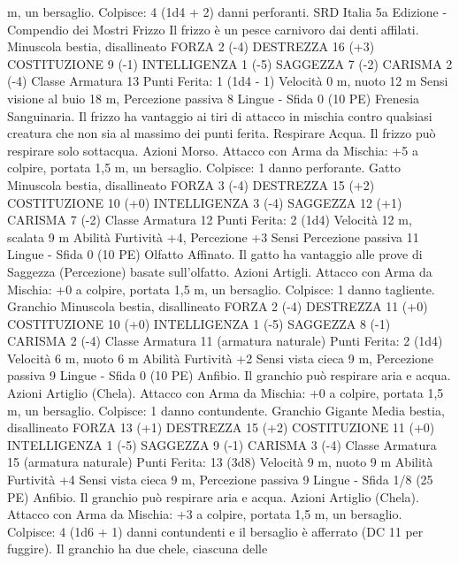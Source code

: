 \begin{multicols}{2}
m, un bersaglio.
Colpisce: 4 (1d4 + 2) danni perforanti.
SRD Italia 5a Edizione - Compendio dei Mostri
Frizzo
Il frizzo è un pesce carnivoro dai denti affilati.
Minuscola bestia, disallineato
FORZA 2 (-4)
DESTREZZA 16 (+3)
COSTITUZIONE 9 (-1)
INTELLIGENZA 1 (-5)
SAGGEZZA 7 (-2)
CARISMA 2 (-4)
Classe Armatura 13
\hspace*{0pt}\hfill{Punti Ferita}: 1 (1d4 - 1)
Velocità 0 m, nuoto 12 m
Sensi visione al buio 18 m, Percezione passiva 8
Lingue -
Sfida 0 (10 PE)
Frenesia Sanguinaria. Il frizzo ha vantaggio ai tiri di attacco in
mischia contro qualsiasi creatura che non sia al massimo dei
punti ferita.
Respirare Acqua. Il frizzo può respirare solo sottacqua.
Azioni
Morso. Attacco con Arma da Mischia: +5 a colpire, portata 1,5
m, un bersaglio.
Colpisce: 1 danno perforante.
Gatto
Minuscola bestia, disallineato
FORZA 3 (-4)
DESTREZZA 15 (+2)
COSTITUZIONE 10 (+0)
INTELLIGENZA 3 (-4)
SAGGEZZA 12 (+1)
CARISMA 7 (-2)
Classe Armatura 12
\hspace*{0pt}\hfill{Punti Ferita}: 2 (1d4)
Velocità 12 m, scalata 9 m
Abilità Furtività +4, Percezione +3
Sensi Percezione passiva 11
Lingue -
Sfida 0 (10 PE)
Olfatto Affinato. Il gatto ha vantaggio alle prove di Saggezza
(Percezione) basate sull’olfatto.
Azioni
Artigli. Attacco con Arma da Mischia: +0 a colpire, portata 1,5
m, un bersaglio.
Colpisce: 1 danno tagliente.
Granchio
Minuscola bestia, disallineato
FORZA 2 (-4)
DESTREZZA 11 (+0)
COSTITUZIONE 10 (+0)
INTELLIGENZA 1 (-5)
SAGGEZZA 8 (-1)
CARISMA 2 (-4)
Classe Armatura 11 (armatura naturale)
\hspace*{0pt}\hfill{Punti Ferita}: 2 (1d4)
Velocità 6 m, nuoto 6 m
Abilità Furtività +2
Sensi vista cieca 9 m, Percezione passiva 9
Lingue -
Sfida 0 (10 PE)
Anfibio. Il granchio può respirare aria e acqua.
Azioni
Artiglio (Chela). Attacco con Arma da Mischia: +0 a colpire,
portata 1,5 m, un bersaglio.
Colpisce: 1 danno contundente.
Granchio Gigante
Media bestia, disallineato
FORZA 13 (+1)
DESTREZZA 15 (+2)
COSTITUZIONE 11 (+0)
INTELLIGENZA 1 (-5)
SAGGEZZA 9 (-1)
CARISMA 3 (-4)
Classe Armatura 15 (armatura naturale)
\hspace*{0pt}\hfill{Punti Ferita}: 13 (3d8)
Velocità 9 m, nuoto 9 m
Abilità Furtività +4
Sensi vista cieca 9 m, Percezione passiva 9
Lingue -
Sfida 1/8 (25 PE)
Anfibio. Il granchio può respirare aria e acqua.
Azioni
Artiglio (Chela). Attacco con Arma da Mischia: +3 a colpire,
portata 1,5 m, un bersaglio.
Colpisce: 4 (1d6 + 1) danni contundenti e il bersaglio è afferrato
(DC 11 per fuggire). Il granchio ha due chele, ciascuna delle

\end{multicols}
